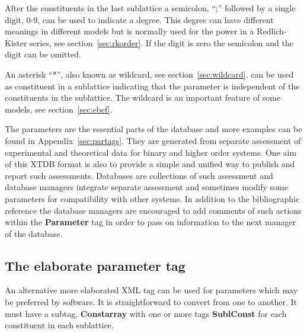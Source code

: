 \documentclass{article}
\begin{document}
After the constituents in the last sublattice a semicolon, ``;''
followed by a single digit, 0-9, can be used to indicate a degree.
This degree can have different meanings in different models but is
normally used for the power in a Redlich-Kister series, see
section~\ref{sec:rkorder}.  If the digit is zero the semicolon and the
digit can be omitted.

An asterisk ``*'', also known as wildcard, see
section~\ref{sec:wildcard}. can be used as constituent in a sublattice
indicating that the parameter is independent of the constituents in
the sublattice.  The wildcard is an important feature of some models,
see section~\ref{sec:ebef}.

The parameters are the essential parts of the database and more
examples can be found in Appendix~\ref{sec:partags}.  They are
generated from separate assessment of experimental and theoretical
data for binary and higher order systems.  One aim of this XTDB format
is also to provide a simple and unified way to publish and report such
assessments.  Databases are collections of such assessment and
database managers integrate separate assessment and sometimes modify
some parameters for compatibility with other systems.  In addition to
the bibliographic reference the database managers are encouraged to
add comments of such actions within the {\bf Parameter} tag in order
to pass on information to the next manager of the database.

\subsection{The elaborate parameter tag}\label{sec:parameter2}

An alternative more elaborated XML tag can be used for parameters
which may be preferred by software.  It is straightforward to convert
from one to another.  It must have a subtag, {\bf Constarray} with one
or more tags {\bf SublConst} for each constituent in each sublattice.
\end{document}
